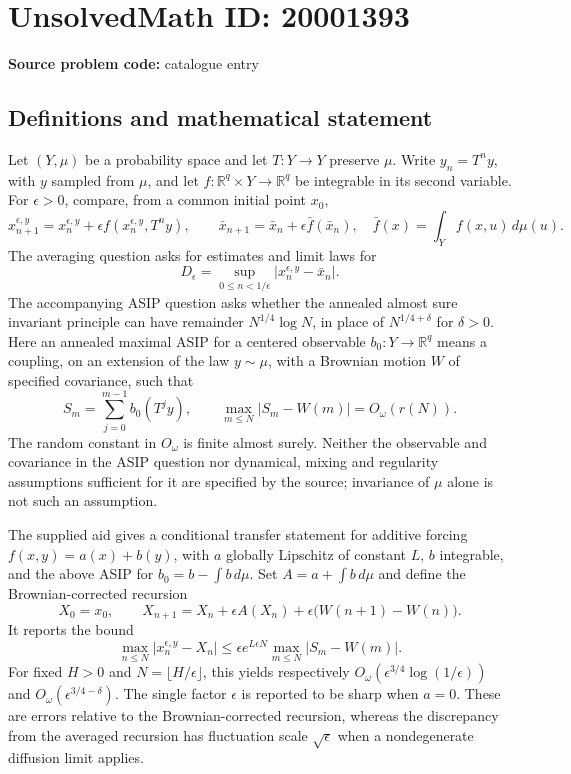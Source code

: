 \documentclass[11pt]{article}
\newcommand{\R}{\mathbb{R}}
\begin{document}
\section*{UnsolvedMath ID: 20001393}
\textbf{Source problem code:} catalogue entry
\subsection{Definitions and mathematical statement}
Let \((Y,\mu)\) be a probability space and let \(T:Y\to Y\) preserve \(\mu\). Write \(y_n=T^ny\), with \(y\) sampled from \(\mu\), and let \(f:\R^q\times Y\to\R^q\) be integrable in its second variable. For \(\epsilon>0\), compare, from a common initial point \(x_0\),
\[
 x_{n+1}^{\epsilon,y}=x_n^{\epsilon,y}+\epsilon f(x_n^{\epsilon,y},T^ny),\qquad
 \bar x_{n+1}=\bar x_n+\epsilon\bar f(\bar x_n),\quad
 \bar f(x)=\int_Y f(x,u)\,d\mu(u).
\]
The averaging question asks for estimates and limit laws for
\[
 D_\epsilon=\sup_{0\le n<1/\epsilon}|x_n^{\epsilon,y}-\bar x_n|.
\]
The accompanying ASIP question asks whether the annealed almost sure invariant principle can have remainder \(N^{1/4}\log N\), in place of \(N^{1/4+\delta}\) for \(\delta>0\). Here an annealed maximal ASIP for a centered observable \(b_0:Y\to\R^q\) means a coupling, on an extension of the law \(y\sim\mu\), with a Brownian motion \(W\) of specified covariance, such that
\[
 S_m=\sum_{j=0}^{m-1}b_0(T^jy),\qquad
 \max_{m\le N}|S_m-W(m)|=O_\omega(r(N)).
\]
The random constant in \(O_\omega\) is finite almost surely. Neither the observable and covariance in the ASIP question nor dynamical, mixing and regularity assumptions sufficient for it are specified by the source; invariance of \(\mu\) alone is not such an assumption.

The supplied aid gives a conditional transfer statement for additive forcing \(f(x,y)=a(x)+b(y)\), with \(a\) globally Lipschitz of constant \(L\), \(b\) integrable, and the above ASIP for \(b_0=b-\int b\,d\mu\). Set \(A=a+\int b\,d\mu\) and define the Brownian-corrected recursion
\[
 X_0=x_0,\qquad X_{n+1}=X_n+\epsilon A(X_n)+\epsilon\bigl(W(n+1)-W(n)\bigr).
\]
It reports the bound
\[
 \max_{n\le N}|x_n^{\epsilon,y}-X_n|
 \le\epsilon e^{L\epsilon N}\max_{m\le N}|S_m-W(m)|.
\]
For fixed \(H>0\) and \(N=\lfloor H/\epsilon\rfloor\), this yields respectively \(O_\omega(\epsilon^{3/4}\log(1/\epsilon))\) and \(O_\omega(\epsilon^{3/4-\delta})\). The single factor \(\epsilon\) is reported to be sharp when \(a=0\). These are errors relative to the Brownian-corrected recursion, whereas the discrepancy from the averaged recursion has fluctuation scale \(\sqrt\epsilon\) when a nondegenerate diffusion limit applies.
\end{document}
